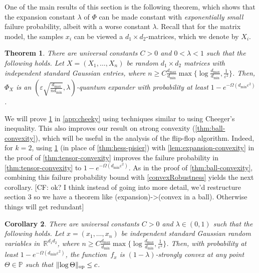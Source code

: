 \documentclass[aos]{imsart}
\newtheorem{theorem}{Theorem}[section]
\newtheorem{corollary}[theorem]{Corollary}
\theoremstyle{definition}
\numberwithin{equation}{section}
\DeclareMathOperator{\op}{op}
\DeclarePairedDelimiter{\norm}{\lVert}{\rVert}
\newcommand{\R}{{\mathbb{R}}}
\renewcommand{\P}{{\mathbb{P}}}
\newcommand{\eps}{\varepsilon}
\newcommand{\CF}[1]{{\color{purple}[CF: #1]}}
\begin{document}
One of the main results of this section is the following theorem, which shows that the expansion constant $\lambda$ of $\Phi$ can be made constant with \emph{exponentially small} failure probability, albeit with a worse constant $\lambda$.
Recall that for the matrix model, the samples $x_i$ can be viewed a $d_1 \times d_2$-matrices, which we denote by $X_i$.

\begin{theorem}\label{thm:operator-cheeger}
There are universal constants $C > 0$ and $0<\lambda<1$ such that the following holds.
Let $X=(X_1,\dots,X_n)$ be random $d_1 \times d_2$ matrices with independent standard Gaussian entries, where $n \geq C \frac{d_{\max}}{d_{\min}} \max\{\log \frac{d_{\max}}{d_{\min}}, \frac1{\eps^2} \}$.
Then, $\Phi_X$ is an $(\eps \sqrt{\frac{d_{\max}}{n d_{\min}}}, \lambda)$-quantum expander with probability at least $1 - e^{ - \Omega( d_{\min} \eps^2)}$.
\end{theorem}

We will prove \cref{thm:operator-cheeger} in \cref{app:cheeky} using techniques similar to \cite{FM20} using Cheeger's inequality.
This also improves our result on strong convexity (\cref{thm:ball-convexity}), which will be useful in the analysis of the flip-flop algorithm. Indeed, for $k = 2$, using \cref{thm:operator-cheeger} (in place of \cref{thm:hess-pisier}) with \cref{lem:expansion-convexity} in the proof of \cref{thm:tensor-convexity} improves the failure probability in \cref{thm:tensor-convexity} to $1 - e^{ - \Omega( d_{\min} \eps^2)}$. As in the proof of \cref{thm:ball-convexity}, combining this failure probability bound with \cref{convexRobustness} yields the next corollary. \CF{ok? I think instead of going into more detail, we'd restructure section 3 so we have a theorem like (expansion)->(convex in a ball). Otherwise things will get redundant}

\begin{corollary}\label{cor:matrix-convexity}
There are universal constants $C>0$ and $\lambda\in(0,1)$ such that the following holds.
Let $x=(x_1,\dots,x_n)$ be independent standard Gaussian random variables in~$\R^{d_1d_2}$, where $n \geq C \frac{d_{\max}}{d_{\min}} \max\{\log \frac{d_{\max}}{d_{\min}}, \frac1{\eps^2} \}$.
Then, with probability at least $1 - e^{ - \Omega( d_{\min} \eps^2)}$, the function~$f_x$ is $(1-\lambda)$-strongly convex at any point $\Theta\in\P$ such that $\norm{\log\Theta}_{\op} \leq c$.
\end{corollary}
\end{document}
